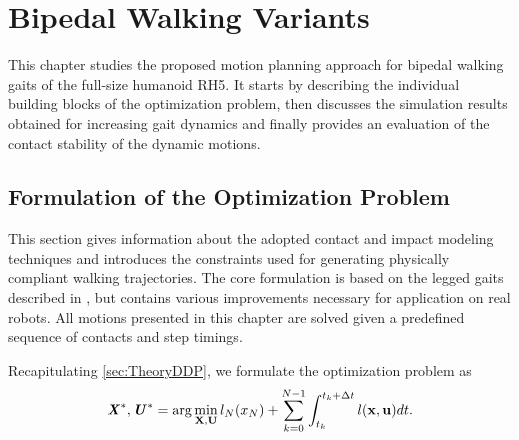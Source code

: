 
\chapter{Bipedal Walking Variants}\label{c4}
This chapter studies the proposed motion planning approach for bipedal walking gaits of the full-size humanoid RH5. It starts by describing the individual building blocks of the optimization problem, then discusses the simulation results obtained for increasing gait dynamics and finally provides an evaluation of the contact stability of the dynamic motions.

\section{Formulation of the Optimization Problem}\label{sec:BipedFormulation}
This section gives information about the adopted contact and impact modeling techniques and introduces the constraints used for generating physically compliant walking trajectories. The core formulation is based on the legged gaits described in \cite{mastalli20crocoddyl}, but contains various improvements necessary for application on real robots. All motions presented in this chapter are solved given a predefined sequence of contacts and step timings. 

Recapitulating \cref{sec:TheoryDDP}, we formulate the optimization problem as
\begin{equation}\label{eqn:optimizationProblem}
\bm{\mathit{X}}^*,\bm{\mathit{U}}^*= 
\arg\min_{\mathbf{X},\mathbf{U}} l_N(x_N)+\sum_{k=0}^{N-1} \int_{t_k}^{t_k+\Delta t} l(\mathbf{x},\mathbf{u})dt. 
\end{equation}


